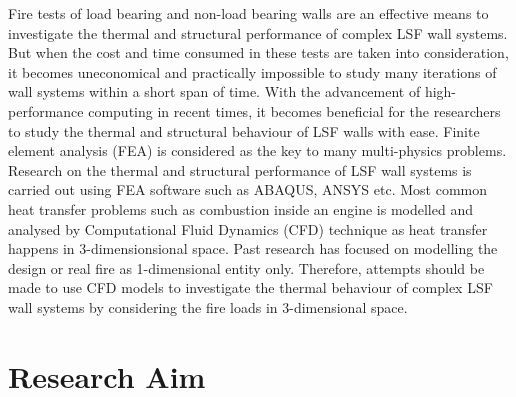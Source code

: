 Fire tests of load bearing and non-load bearing walls are an effective means to investigate the thermal and structural performance of complex LSF wall systems. But when the cost and time consumed in these tests are taken into consideration, it becomes uneconomical and practically impossible to study many iterations of wall systems within a short span of time. With the advancement of high-performance computing in recent times, it becomes beneficial for the researchers to study the thermal and structural behaviour of LSF walls with ease. Finite element analysis (FEA) is considered as the key to many multi-physics problems. Research on the thermal and structural performance of LSF wall systems is carried out using FEA software such as ABAQUS, ANSYS etc. Most common heat transfer problems such as combustion inside an engine is modelled and analysed by Computational Fluid Dynamics (CFD) technique as heat transfer happens in 3-dimensionsional space. Past research has focused on modelling the design or real fire as 1-dimensional entity only. Therefore, attempts should be made to use CFD models to investigate the thermal behaviour of complex LSF wall systems by considering the fire loads in 3-dimensional space.

\section{Research Aim}

